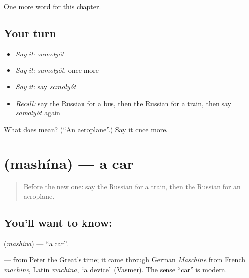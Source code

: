 \begin{grammarlens}[title={What you've built}]
One more word for this chapter.
\end{grammarlens}

\subsection*{Your turn}
\begin{itemize}
\raggedright
  \item \emph{Say it:} \emph{samolyót}
  \item \emph{Say it:} \emph{samolyót}, once more
  \item \emph{Say it:} say \emph{samolyót}
  \item \emph{Recall:} say the Russian for a bus, then the Russian for a train, then say \emph{samolyót} again
\end{itemize}

\begin{tcolorbox}[breakable,colback=teal!4,colframe=teal!35!black,title={Before you move on}]
What does  mean? (\textquotedblleft{}An aeroplane\textquotedblright{}.) Say it once more.
\end{tcolorbox}
\section[\texorpdfstring{\ru{машина} (mashína)}{машина (mashína)}]{ (mashína) — a car}

\label{lesson:RU-C79-car}



\begin{quote}
Before the new one: say the Russian for a train, then the Russian for an aeroplane.
\end{quote}

\subsection*{You'll want to know: }
\textbf{} (\emph{mashína}) — \textquotedblleft{}a car\textquotedblright{}.

\begin{cousinweb}
\textbf{} — from Peter the Great's time; it came through German \emph{Maschine} from French \emph{machine}, Latin \emph{māchina}, \textquotedblleft{}a device\textquotedblright{} (Vasmer). The sense \textquotedblleft{}car\textquotedblright{} is modern.
\end{cousinweb}

